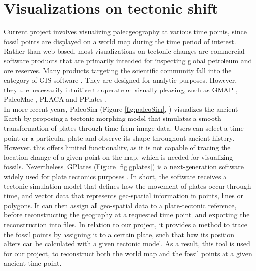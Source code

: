\documentclass[11pt, a4paper,oneside,chapterprefix=false]{scrbook}
\begin{document}
\newpage

\section{Visualizations on tectonic shift}
Current project involves visualizing paleogeography at various time points, since fossil points are displayed on a world map during the time period of interest. Rather than web-based, most visualizations on tectonic changes are commercial software products that are primarily intended for inspecting global petroleum and ore reserves.  Many products targeting the scientific community fall into the category of GIS software \cite{steiniger2010gis}. They are designed for analytic purposes. However, they are necessarily intuitive to operate or visually pleasing, such as GMAP \cite{torsvik1999plate}, PaleoMac \cite{cogne2003paleomac}, PLACA \cite{matias2005placa} and PPlates \cite{smith2007re}. \\

In more recent years, PaleoSim (Figure \ref{fig:paleoSim}, \cite{rogge2010visualization}) visualizes the ancient Earth by proposing a tectonic morphing model that simulates a smooth transformation of plates through time from image data. Users can select a time point or a particular plate and observe its shape throughout ancient history. However, this offers limited functionality, as it is not capable of tracing the location change of a given point on the map, which is needed for visualizing fossils. Nevertheless, GPlates (Figure \ref{fig:gplates}) is a next-generation software widely used for plate tectonics purposes \cite{boyden2011next} \cite{williams2012open} \cite{gurnis2012plate}. In short, the software receives a tectonic simulation model that defines how the movement of plates occur through time, and vector data that represents geo-spatial information in points, lines or polygons. It can then assign all geo-spatial data to a plate-tectonic reference, before reconstructing the geography at a requested time point, and exporting the reconstruction into files. In relation to our project, it provides a method to trace the fossil points by assigning it to a certain plate, such that how its position alters can be calculated with a given tectonic model. As a result, this tool is used for our project, to reconstruct both the world map and the fossil points at a given ancient time point. \\
\end{document}

